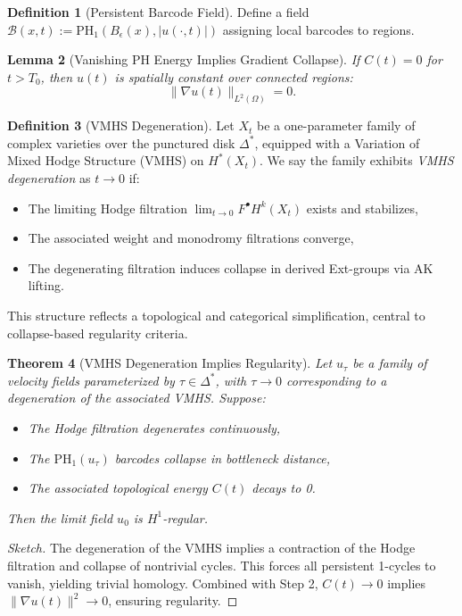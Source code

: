 \documentclass[11pt]{article}
\newtheorem{theorem}{Theorem}[section]
\newtheorem{lemma}[theorem]{Lemma}
\theoremstyle{definition}
\newtheorem{definition}[theorem]{Definition}
\begin{document}
\begin{definition}[Persistent Barcode Field]
Define a field $\mathcal{B}(x,t) := \mathrm{PH}_1(B_\epsilon(x), |u(\cdot,t)|)$ assigning local barcodes to regions.
\end{definition}

\begin{lemma}[Vanishing PH Energy Implies Gradient Collapse]
If $C(t) = 0$ for $t > T_0$, then $u(t)$ is spatially constant over connected regions:
\[
\|\nabla u(t)\|_{L^2(\Omega)} = 0.
\]
\end{lemma}

\begin{definition}[VMHS Degeneration] \label{def:vmhs-collapse}
Let $X_t$ be a one-parameter family of complex varieties over the punctured disk $\Delta^*$, equipped with a Variation of Mixed Hodge Structure (VMHS) on $H^*(X_t)$.  
We say the family exhibits \emph{VMHS degeneration} as $t \to 0$ if:
\begin{itemize}
  \item The limiting Hodge filtration $\lim_{t \to 0} F^\bullet H^k(X_t)$ exists and stabilizes,
  \item The associated weight and monodromy filtrations converge,
  \item The degenerating filtration induces collapse in derived Ext-groups via AK lifting.
\end{itemize}
This structure reflects a topological and categorical simplification, central to collapse-based regularity criteria.
\end{definition}

\begin{theorem}[VMHS Degeneration Implies Regularity]
Let $u_\tau$ be a family of velocity fields parameterized by $\tau \in \Delta^*$, with $\tau \to 0$ corresponding to a degeneration of the associated VMHS. Suppose:
\begin{itemize}
    \item The Hodge filtration degenerates continuously,
    \item The $\mathrm{PH}_1(u_\tau)$ barcodes collapse in bottleneck distance,
    \item The associated topological energy $C(t)$ decays to 0.
\end{itemize}
Then the limit field $u_0$ is $H^1$-regular.
\end{theorem}

\begin{proof}[Sketch]
The degeneration of the VMHS implies a contraction of the Hodge filtration and collapse of nontrivial cycles. This forces all persistent 1-cycles to vanish, yielding trivial homology. Combined with Step 2, $C(t) \to 0$ implies $\|\nabla u(t)\|^2 \to 0$, ensuring regularity.
\end{proof}
\end{document}
